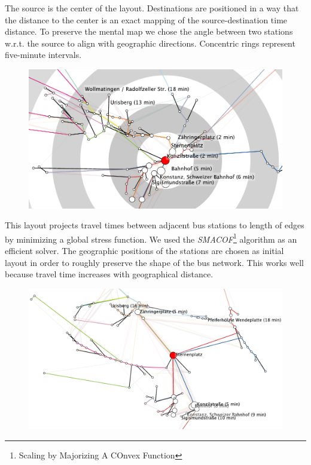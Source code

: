 \documentclass[a4paper, twocolumn,
final
]{article}
\begin{document}
\begin{description}
\setlength{\itemsep}{0pt}
\item[Radial Layout.]  The source is the center of the layout. Destinations are positioned in a way that the distance to the center is an exact mapping of the source-destination time distance.
To preserve the mental map we chose the angle between two stations w.r.t. the source to align with geographic directions. Concentric rings represent five-minute intervals.
\begin{figure}[h]
	\centering
		\includegraphics[width=0.9\linewidth]{svgs/radial_crop.pdf}
\end{figure} 
\item[Stress-Majorization Layout.]  This layout projects travel times between adjacent bus stations to length of edges by minimizing a global stress function. We used the \emph{SMACOF}\footnote{Scaling by Majorizing A COnvex Function} algorithm as an efficient solver.
The geographic positions of the stations are chosen as initial layout in order to roughly preserve the shape of the bus network. This works well because travel time increases with geographical distance.
\begin{figure}[h]
	\centering
		\includegraphics[width=0.9\linewidth]{svgs/stress_crop.pdf}
\end{figure} 
\end{description}
\end{document}
